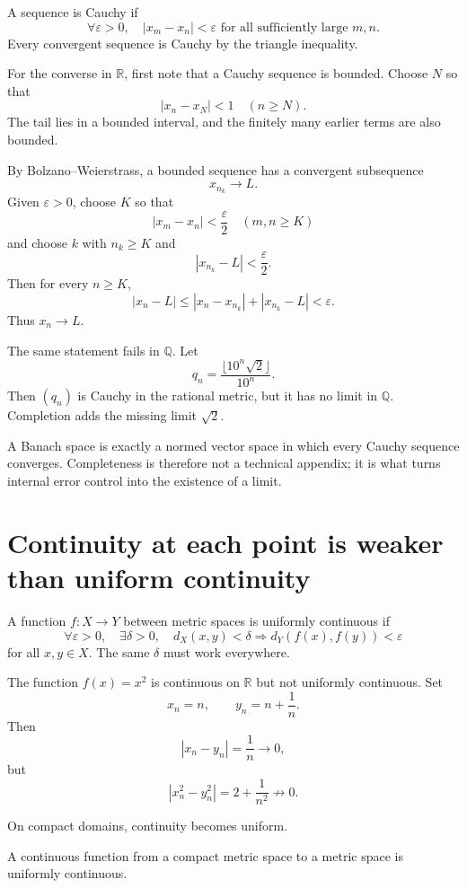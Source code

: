 A sequence is Cauchy if
\[
  \forall\varepsilon>0,
  \quad
  |x_m-x_n|<\varepsilon
  \text{ for all sufficiently large }m,n.
\]
Every convergent sequence is Cauchy by the triangle inequality.

For the converse in \(\mathbb R\), first note that a Cauchy sequence is bounded.  Choose \(N\) so that
\[
  |x_n-x_N|<1
  \quad(n\ge N).
\]
The tail lies in a bounded interval, and the finitely many earlier terms are also bounded.

By Bolzano--Weierstrass, a bounded sequence has a convergent subsequence
\[
  x_{n_k}\to L.
\]
Given \(\varepsilon>0\), choose \(K\) so that
\[
  |x_m-x_n|<\frac\varepsilon2
  \quad(m,n\ge K)
\]
and choose \(k\) with \(n_k\ge K\) and
\[
  |x_{n_k}-L|<\frac\varepsilon2.
\]
Then for every \(n\ge K\),
\[
  |x_n-L|
  \le|x_n-x_{n_k}|+|x_{n_k}-L|
  <\varepsilon.
\]
Thus \(x_n\to L\).

The same statement fails in \(\mathbb Q\).  Let
\[
  q_n=\frac{\lfloor10^n\sqrt2\rfloor}{10^n}.
\]
Then \((q_n)\) is Cauchy in the rational metric, but it has no limit in \(\mathbb Q\).  Completion adds the missing limit \(\sqrt2\).

A Banach space is exactly a normed vector space in which every Cauchy sequence converges.  Completeness is therefore not a technical appendix; it is what turns internal error control into the existence of a limit.

\section{Continuity at each point is weaker than uniform continuity}

A function \(f:X\to Y\) between metric spaces is uniformly continuous if
\[
  \forall\varepsilon>0,
  \quad
  \exists\delta>0,
  \quad
  d_X(x,y)<\delta
  \Longrightarrow
  d_Y(f(x),f(y))<\varepsilon
\]
for all \(x,y\in X\).  The same \(\delta\) must work everywhere.

The function \(f(x)=x^2\) is continuous on \(\mathbb R\) but not uniformly continuous.  Set
\[
  x_n=n,
  \qquad
  y_n=n+\frac1n.
\]
Then
\[
  |x_n-y_n|=\frac1n\to0,
\]
but
\[
  |x_n^2-y_n^2|
  =2+\frac1{n^2}
  \not\to0.
\]

On compact domains, continuity becomes uniform.

\begin{theorem}
A continuous function from a compact metric space to a metric space is uniformly continuous.
\end{theorem}

